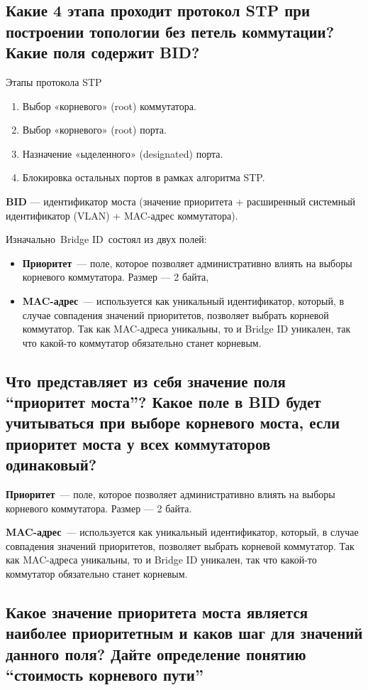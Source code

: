 \subsection{Какие 4 этапа проходит протокол STP при построении топологии
	без петель коммутации? Какие поля содержит BID?}

Этапы протокола STP
\begin{enumerate}
	\item Выбор «корневого» (root) коммутатора.
	\item Выбор «корневого» (root) порта.
	\item Назначение «ыделенного» (designated) порта.
	\item Блокировка остальных портов в рамках алгоритма STP.
\end{enumerate}

\textbf{BID} --- идентификатор моста
(значение приоритета + расширенный системный идентификатор (VLAN)
+ MAC-адрес коммутатора).

Изначально Bridge ID состоял из двух полей:
\begin{itemize}
	\item \textbf{Приоритет} --- поле, которое позволяет административно влиять
		на выборы корневого коммутатора. Размер --- 2 байта,
	\item \textbf{MAC-адрес} --- используется как уникальный идентификатор,
		который, в случае совпадения значений приоритетов,
		позволяет выбрать корневой коммутатор.
		Так как MAC-адреса уникальны, то и Bridge ID уникален,
		так что какой-то коммутатор обязательно станет корневым.
\end{itemize}

\subsection{Что представляет из себя значение поля “приоритет моста”? Какое поле в BID будет учитываться при выборе корневого моста, если приоритет моста у всех коммутаторов одинаковый?}

\textbf{Приоритет} --- поле, которое позволяет административно влиять
на выборы корневого коммутатора. Размер — 2 байта.\par
\textbf{MAC-адрес} --- используется как уникальный идентификатор,
который, в случае совпадения значений приоритетов, позволяет выбрать корневой
коммутатор. Так как MAC-адреса уникальны, то и Bridge ID уникален,
так что какой-то коммутатор обязательно станет корневым.

\subsection{Какое значение приоритета моста является наиболее приоритетным и каков шаг для значений данного поля? Дайте определение понятию “стоимость корневого пути”}

